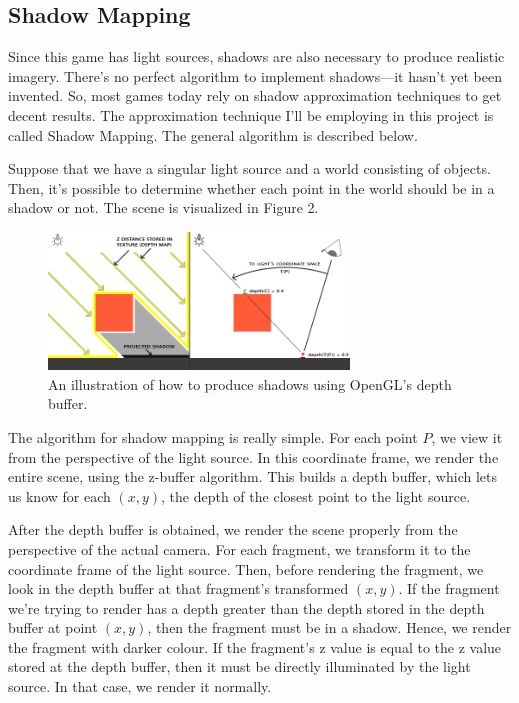 \documentclass[11pt]{article}
\begin{document}
\subsection{Shadow Mapping}
Since this game has light sources, shadows are also necessary to produce realistic imagery. There's no perfect algorithm to implement shadows---it hasn't yet been invented. So, most games today rely on shadow approximation techniques to get decent results. The approximation technique I'll be employing in this project is called Shadow Mapping. The general algorithm is described below.

Suppose that we have a singular light source and a world consisting of objects. Then, it's possible to determine whether each point in the world should be in a shadow or not. The scene is visualized in Figure 2.

\begin{figure}[H]
\includegraphics[width=8cm]{shadow_mapping_theory_spaces}
\centering
\caption{An illustration of how to produce shadows using OpenGL's depth buffer\cite{shadow-map-learn-opengl}.}
\end{figure}

The algorithm for shadow mapping is really simple. For each point $P$, we view it from the perspective of the light source. In this coordinate frame, we render the entire scene, using the z-buffer algorithm. This builds a depth buffer, which lets us know for each $(x, y)$, the depth of the closest point to the light source.

After the depth buffer is obtained, we render the scene properly from the perspective of the actual camera. For each fragment, we transform it to the coordinate frame of the light source. Then, before rendering the fragment, we look in the depth buffer at that fragment's transformed $(x, y)$. If the fragment we're trying to render has a depth greater than the depth stored in the depth buffer at point $(x, y)$, then the fragment must be in a shadow. Hence, we render the fragment with darker colour. If the fragment's z value is equal to the z value stored at the depth buffer, then it must be directly illuminated by the light source. In that case, we render it normally.  
\end{document}
